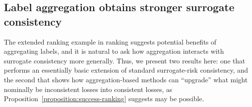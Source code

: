 \documentclass[11pt]{article}
\newcommand{\sloss}{\varphi}  %
\begin{document}

\subsection{Label aggregation obtains stronger surrogate consistency}
\label{sec:consistency-agg}

The extended ranking example in ranking suggests potential benefits of
aggregating labels, and it is natural to ask how aggregation interacts with
surrogate consistency more generally.
%
Thus, we present two results here: one that performs an essentially
basic extension of standard surrogate-risk consistency, and the second
that shows how aggregation-based methods can ``upgrade'' what might
nominally be inconsistent losses into consistent losses,
as Proposition~\ref{proposition:success-ranking} suggests may be possible.
%
\end{document}
